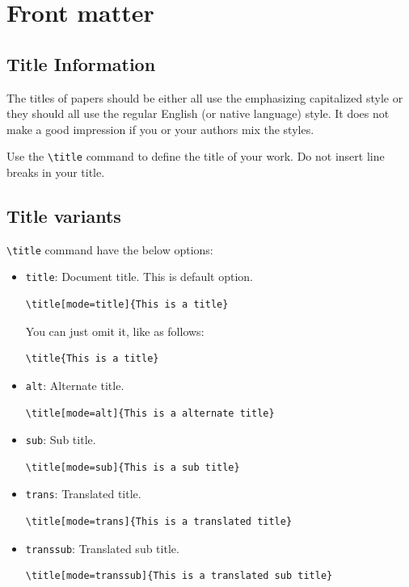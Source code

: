 \documentclass[
]{ceurart}
\begin{document}
\section{Front matter}

\subsection{Title Information}

The titles of papers should be either all use the emphasizing
capitalized style or they should all use the regular English (or
native language) style. It does not make a good impression if you or
your authors mix the styles.

Use the \verb|\title| command to define the title of your work. Do not
insert line breaks in your title.

\subsection{Title variants}

\verb|\title| command have the below options:
\begin{itemize}
\item \verb|title|: Document title. This is default option.
\begin{verbatim}
\title[mode=title]{This is a title}
\end{verbatim}
You can just omit it, like as follows:
\begin{verbatim}
\title{This is a title}
\end{verbatim}

\item \verb|alt|: Alternate title.
\begin{verbatim}
\title[mode=alt]{This is a alternate title}
\end{verbatim}

\item \verb|sub|: Sub title.
\begin{verbatim}
\title[mode=sub]{This is a sub title}
\end{verbatim}

\item \verb|trans|: Translated title.
\begin{verbatim}
\title[mode=trans]{This is a translated title}
\end{verbatim}

\item \verb|transsub|: Translated sub title.
\begin{verbatim}
\title[mode=transsub]{This is a translated sub title}
\end{verbatim}
\end{itemize}
\end{document}
